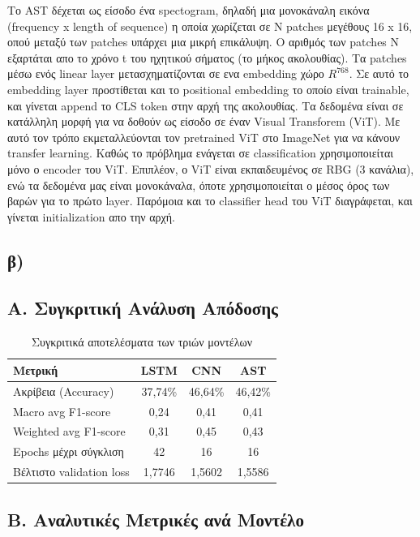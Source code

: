 \documentclass[a4paper,12pt]{article}
\begin{document}
Tο AST δέχεται ως είσοδο ένα spectogram, δηλαδή μια μονοκάναλη εικόνα
(frequency x length of sequence) η οποία χωρίζεται σε N patches μεγέθους 16 x
16, οπού μεταξύ των patches υπάρχει μια μικρή επικάλυψη. Ο αριθμός των patches
Ν εξαρτάται απο το χρόνο t του ηχητικού σήματος (το μήκος ακολουθίας). Τα
patches μέσω ενός linear layer μετασχηματίζονται σε ενα embedding χώρο $R^768$.
Σε αυτό το embedding layer προστίθεται και το positional embedding το οποίο
είναι trainable, και γίνεται append το CLS token στην αρχή της ακολουθίας. Τα
δεδομένα είναι σε κατάλληλη μορφή για να δοθούν ως είσοδο σε έναν Visual
Transforem (ViT). Με αυτό τον τρόπο εκμεταλλεύονται τον pretrained ViT στο
ImageNet για να κάνουν transfer learning. Καθώς το πρόβλημα ενάγεται σε
classification χρησιμοποιείται μόνο ο encoder του ViT. Επιπλέον, ο ViT είναι
εκπαιδευμένος σε RBG (3 κανάλια), ενώ τα δεδομένα μας είναι μονοκάναλα, όποτε
χρησιμοποιείται ο μέσος όρος των βαρών για το πρώτο layer. Παρόμοια και το
classifier head του ViT διαγράφεται, και γίνεται initialization απο την αρχή.

\subsection*{β)}

\subsection*{Α. Συγκριτική Ανάλυση Απόδοσης}

\begin{table}[H]
    \centering
    \begin{tabular}{lccc}
    \toprule
    \textbf{Μετρική} & \textbf{LSTM} & \textbf{CNN} & \textbf{AST} \\
    \midrule
    Ακρίβεια (Accuracy) & 37,74\% & 46,64\% & 46,42\% \\
    Macro avg F1-score & 0,24 & 0,41 & 0,41 \\
    Weighted avg F1-score & 0,31 & 0,45 & 0,43 \\
    Epochs μέχρι σύγκλιση & 42 & 16 & 16 \\
    Βέλτιστο validation loss & 1,7746 & 1,5602 & 1,5586 \\
    \bottomrule
    \end{tabular}
    \caption{Συγκριτικά αποτελέσματα των τριών μοντέλων}
\end{table}

\subsection*{Β. Αναλυτικές Μετρικές ανά Μοντέλο}
\end{document}

